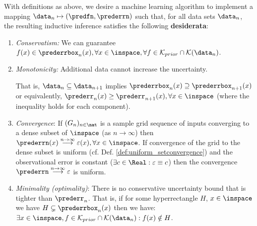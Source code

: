 \begin{defn}[Desiderata] \label{def:KIdesiderata} With definitions as above, we desire a machine learning algorithm to implement a mapping $\data_n \mapsto (\predfn,\prederrn)$ such that, for all data sets $\data_n$, the resulting inductive inference satisfies the following \textbf{desiderata}:
\begin{enumerate}
	\item \textit{Conservatism:} We can guarantee  $ f(x) \in \prederrbox_n(x),  \forall x \in \inspace, \forall f \in \mathcal K_{prior} \cap \mathcal K(\data_n)$.
	\item \textit{Monotonicity:} Additional data cannot increase the uncertainty. 
	
	That is, $\data_n \subseteq \data_{n+1} $ implies 
		$\prederrbox_n(x) \supseteq \prederrbox_{n+1}(x)$ or equivalently, $\prederr_n(x) \geq \prederr_{n+1}(x), \forall x \in \inspace$ (where the inequality holds for each component).
	\item \textit{Convergence}: If $(G_n )_{n \in \nat }$ is a sample grid sequence of inputs converging to a dense subset of $\inspace$ (as $n \to \infty$) then  $\prederrn(x) \stackrel{n \to \infty}{\longrightarrow} \varepsilon(x), \forall x \in \inspace$. If convergence of the grid to the dense subset is uniform (cf. Def. \ref{def:uniform_setconvergence}) and the observational error is constant ($\exists c \in \Real: \varepsilon \equiv c $) then the convergence  $\prederrn \stackrel{n \to \infty}{\longrightarrow} \varepsilon$ is uniform. 
	   \item \textit{Minimality (optimality)}: There is no conservative uncertainty bound that is tighter than $\prederr_n$. That is, if for some hyperrectangle $H$, $x \in \inspace$ we have $H \subsetneq \prederrbox_n(x)$ then we have: $\exists x \in \inspace, f \in \mathcal K_{prior} \cap \mathcal K(\data_n) : f(x) \notin H$. 
\end{enumerate}
\end{defn}


